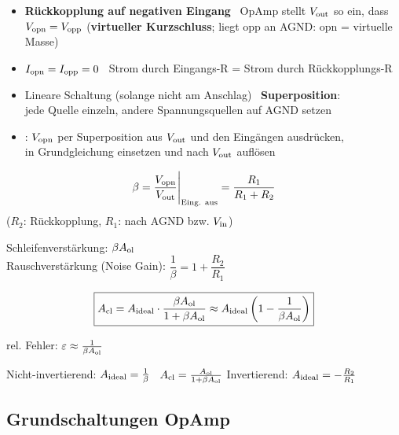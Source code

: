 \begin{itemize}
	\item \textbf{Rückkopplung auf negativen Eingang} \textrightarrow\ OpAmp stellt $V_{\rm out}$ so ein, dass \\
		$V_{\rm opn} = V_{\rm opp}$ \quad (\textbf{virtueller Kurzschluss}; liegt opp an AGND: opn = virtuelle Masse)
	\item $I_{\rm opn} = I_{\rm opp} = 0$ \textrightarrow\ Strom durch Eingangs-R = Strom durch Rückkopplungs-R
	\item Lineare Schaltung (solange nicht am Anschlag) \textrightarrow\ \textbf{Superposition}: \\
		jede Quelle einzeln, andere Spannungsquellen auf AGND setzen
	\item {}: $V_{\rm opn}$ per Superposition aus $V_{\rm out}$ und den Eingängen ausdrücken, \\
		in Grundgleichung einsetzen und nach $V_{\rm out}$ auflösen
\end{itemize}


\vspace{0.1cm}

\begin{minipage}[c]{0.48\columnwidth}
	$$ \beta = \frac{V_{\rm opn}}{V_{\rm out}}\Bigg|_{\text{Eing. aus}} = \frac{R_1}{R_1 + R_2} $$
	\centering ($R_2$: Rückkopplung, $R_1$: nach AGND bzw. $V_{\rm in}$)
\end{minipage}
\hfill
\begin{minipage}[c]{0.48\columnwidth}
	Schleifenverstärkung: $\beta A_{\rm ol}$ \\
	Rauschverstärkung (Noise Gain): $\dfrac{1}{\beta} = 1 + \dfrac{R_2}{R_1}$
\end{minipage}

\vspace{0.1cm}

$$ \boxed{ A_{\rm cl} = A_{\rm ideal} \cdot \frac{\beta A_{\rm ol}}{1 + \beta A_{\rm ol}} \approx A_{\rm ideal} \left( 1 - \frac{1}{\beta A_{\rm ol}} \right) } $$
\centerline{rel. Fehler: $\varepsilon \approx \frac{1}{\beta A_{\rm ol}}$}

Nicht-invertierend: $A_{\rm ideal} = \frac{1}{\beta}$ \textrightarrow\ $A_{\rm cl} = \frac{A_{\rm ol}}{1 + \beta A_{\rm ol}}$ \qquad
Invertierend: $A_{\rm ideal} = -\frac{R_2}{R_1}$


\subsection{Grundschaltungen OpAmp}

